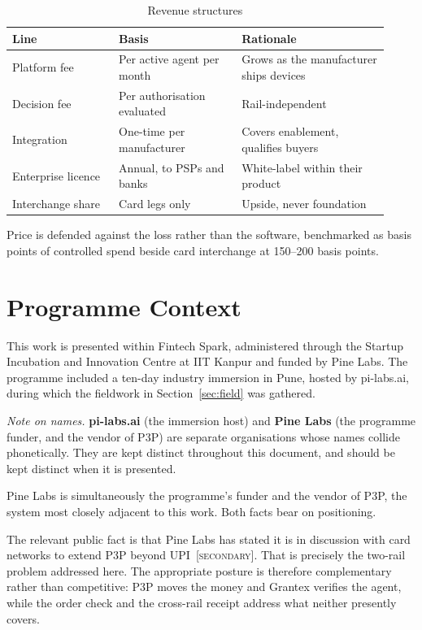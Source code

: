 \documentclass[journal,onecolumn,11pt]{IEEEtran}
\newcommand{\secondary}{{\footnotesize\textsc{\textcolor{gray!80!black}{[secondary]}}}}
\begin{document}
\begin{table}[t]
\centering
\caption{Revenue structures}
\label{tab:rev}
\begin{tabular}{@{}p{0.26\linewidth}p{0.30\linewidth}p{0.36\linewidth}@{}}
\toprule
\textbf{Line} & \textbf{Basis} & \textbf{Rationale} \\
\midrule
Platform fee & Per active agent per month & Grows as the manufacturer ships devices \\
Decision fee & Per authorisation evaluated & Rail-independent \\
Integration & One-time per manufacturer & Covers enablement, qualifies buyers \\
Enterprise licence & Annual, to PSPs and banks & White-label within their product \\
Interchange share & Card legs only & Upside, never foundation \\
\bottomrule
\end{tabular}
\end{table}

Price is defended against the loss rather than the software, benchmarked as basis
points of controlled spend beside card interchange at 150--200 basis points.

\section{Programme Context}\label{sec:prog}
This work is presented within Fintech Spark, administered through the Startup
Incubation and Innovation Centre at IIT Kanpur and funded by Pine Labs. The programme
included a ten-day industry immersion in Pune, hosted by pi-labs.ai, during which the
fieldwork in Section~\ref{sec:field} was gathered.

\emph{Note on names.} \textbf{pi-labs.ai} (the immersion host) and \textbf{Pine
Labs} (the programme funder, and the vendor of P3P) are separate organisations whose
names collide phonetically. They are kept distinct throughout this document, and should
be kept distinct when it is presented.

Pine Labs is simultaneously the programme's funder and the vendor of P3P, the system
most closely adjacent to this work. Both facts bear on positioning.

The relevant public fact is that Pine Labs has stated it is in discussion with card
networks to extend P3P beyond UPI~\secondary. That is precisely the two-rail problem
addressed here. The appropriate posture is therefore complementary rather than
competitive: P3P moves the money and Grantex verifies the agent, while the order check
and the cross-rail receipt address what neither presently covers.
\end{document}
